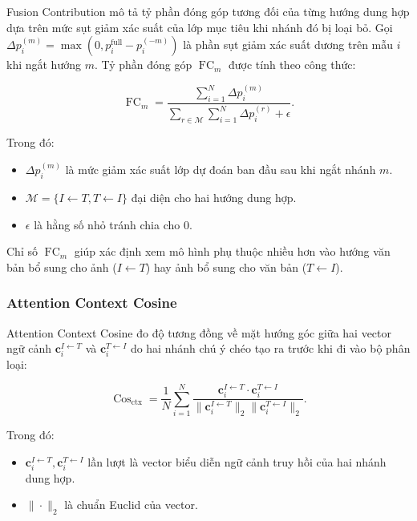 Fusion Contribution \cite{Selvaraju2017GradCAM} mô tả tỷ phần đóng góp tương đối của từng hướng dung hợp dựa trên mức sụt giảm xác suất của lớp mục tiêu khi nhánh đó bị loại bỏ. Gọi $\Delta p_i^{(m)} = \max\left(0, p_i^{\mathrm{full}} - p_i^{(-m)}\right)$ là phần sụt giảm xác suất dương trên mẫu $i$ khi ngắt hướng $m$. Tỷ phần đóng góp $\operatorname{FC}_m$ được tính theo công thức:

\begin{equation}
    \operatorname{FC}_{m} = \frac{\sum_{i=1}^{N} \Delta p_i^{(m)}}{\sum_{r \in \mathcal{M}} \sum_{i=1}^{N} \Delta p_i^{(r)} + \epsilon}.
    \label{eq:ch4_fusion_contribution}
\end{equation}

Trong đó:
\begin{itemize}
    \item $\Delta p_i^{(m)}$ là mức giảm xác suất lớp dự đoán ban đầu sau khi ngắt nhánh $m$.
    \item $\mathcal{M} = \{I\leftarrow T, T\leftarrow I\}$ đại diện cho hai hướng dung hợp.
    \item $\epsilon$ là hằng số nhỏ tránh chia cho 0.
\end{itemize}

Chỉ số $\operatorname{FC}_m$ giúp xác định xem mô hình phụ thuộc nhiều hơn vào hướng văn bản bổ sung cho ảnh ($I\leftarrow T$) hay ảnh bổ sung cho văn bản ($T\leftarrow I$).

\subsubsection{Attention Context Cosine}

Attention Context Cosine \cite{Reimers2019SentenceBERT} đo độ tương đồng về mặt hướng góc giữa hai vector ngữ cảnh $\mathbf{c}_i^{I\leftarrow T}$ và $\mathbf{c}_i^{T\leftarrow I}$ do hai nhánh chú ý chéo tạo ra trước khi đi vào bộ phân loại:

\begin{equation}
    \operatorname{Cos}_{\mathrm{ctx}} = \frac{1}{N} \sum_{i=1}^{N} \frac{\mathbf{c}_i^{I\leftarrow T} \cdot \mathbf{c}_i^{T\leftarrow I}}{\|\mathbf{c}_i^{I\leftarrow T}\|_2 \|\mathbf{c}_i^{T\leftarrow I}\|_2}.
    \label{eq:ch4_attention_context_cosine}
\end{equation}

Trong đó:
\begin{itemize}
    \item $\mathbf{c}_i^{I\leftarrow T}, \mathbf{c}_i^{T\leftarrow I}$ lần lượt là vector biểu diễn ngữ cảnh truy hồi của hai nhánh dung hợp.
    \item $\|\cdot\|_2$ là chuẩn Euclid của vector.
\end{itemize}

